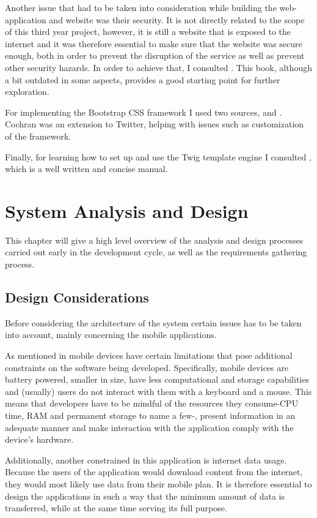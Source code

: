 \documentclass[12pt]{ecsproject}     %
\begin{document}
Another issue that had to be taken into consideration while building the web-application and website was their security. It is not directly related to the scope of this third year project, however, it is still a website that is exposed to the internet and it was therefore essential to make sure that the website was secure enough, both in order to prevent the disruption of the service as well as prevent other security hazards. In order to achieve that, I consulted \citet{eps}. This book, although a bit outdated in some aspects, provides a good starting point for further exploration.

For implementing the Bootstrap CSS framework I used two sources, \cite{bootman} and \citet{bootbook}. Cochran was an extension to Twitter, helping with issues such as customization of the framework.

Finally, for learning how to set up and use the Twig template engine I consulted \cite{tbook}, which is a well written and concise manual.

\chapter{System Analysis and Design}
\label{chap:sysdesing}
This chapter will give a high level overview of the analysis and design processes carried out early in the development cycle, as well as the requirements gathering process.

\section{Design Considerations}
Before considering the architecture of the system certain issues has to be taken into account, mainly concerning the mobile applications.

As mentioned in \cite{la} mobile devices have certain limitations that pose additional constraints on the software being developed. Specifically, mobile devices are battery powered, smaller in size, have less computational and storage capabilities and (usually) users do not interact with them with a keyboard and a mouse. This means that developers have to be mindful of the resources they consume-CPU time, RAM and permanent storage to name a few-, present information in an adequate manner and make interaction with the application comply with the device's hardware.

Additionally, another constrained in this application is internet data usage. Because the users of the application would download content from the internet, they would most likely use data from their mobile plan. It is therefore essential to design the applications in such a way that the minimum amount of data is transferred, while at the same time serving its full purpose.
\end{document}
